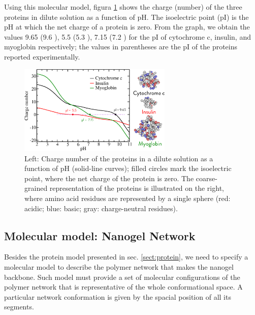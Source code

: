 Using this molecular model,  figura \ref{fig:protein-charge} shows the charge (number) of the three proteins in dilute solution as a function of  pH.
The isoelectric point (pI) is the pH at which the net charge of a protein is zero.
From the graph, we obtain the values  9.65 (9.6 ), 5.5 (5.3 ), 7.15 (7.2 ) for the pI of cytochrome c, insulin, and myoglobin respectively;
the values in parentheses are the pI of the proteins reported experimentally. 


 \begin{figure}[!htb]
     \centering
     \includegraphics[width=0.65\textwidth]{Figures/graphs-gel2/protein-model.png}
     \caption{Left: Charge number of the proteins in a dilute solution as a function of  pH (solid-line curves);
     filled circles mark  the isoelectric point,
     where the net charge of the protein is zero.
     The coarse-grained representation of the proteins is illustrated on the right, where amino acid residues are represented by a single sphere (red: acidic; blue: basic; gray: charge-neutral residues).}
     \label{fig:protein-charge}
 \end{figure}






 





\subsection{Molecular model: Nanogel Network}

Besides the protein model presented in sec.  \ref{sect:protein},   we need to specify a molecular model to describe the polymer network that makes the nanogel backbone.
Such model must provide  a set of molecular configurations of the polymer network that is representative of the whole conformational space.
A particular network conformation is given by the spacial position of all its segments.


